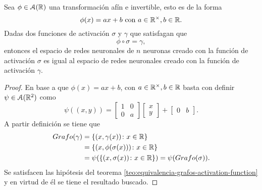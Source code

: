 \begin{corolario}\label{corolario:afine-activation-function}
    Sea $\phi \in \mathcal{A}(\mathbb{R})$ una transformación afín e invertible, esto es de la forma 
    \begin{equation}
        \phi(x) = a x + b 
        \text{ con } a \in \mathbb{R}^\times, b \in \mathbb{R}.
    \end{equation}
    Dadas dos funciones de activación $\sigma$ y $\gamma$ que satisfagan que 
    \begin{equation}
        \phi \circ \sigma = \gamma,
    \end{equation} 
    entonces 
    el espacio de redes neuronales de $n$ neuronas creado con la función de activación $\sigma$ es  
    igual al espacio de redes neuronales creado con la función de activación $\gamma$. 
\end{corolario}
\begin{proof}
    En base a que $\phi(x) = a x + b$, con 
    $a \in \mathbb{R}^\times, b \in \mathbb{R}$
    basta con definir 
     $\psi  \in \mathcal{A}(\mathbb{R}^2)$ como 
    \begin{equation}
        \psi((x,y)) =  
        \begin{bmatrix}
            1 & 0 \\
             0& a
        \end{bmatrix}
        \begin{bmatrix}
            x \\
            y
        \end{bmatrix}
        +
        \begin{bmatrix}
            0 & b
        \end{bmatrix}.
    \end{equation}
    A partir  definición se tiene que 
    \begin{align}
        Grafo(\gamma) &=
        \{ (x, \gamma(x)) \colon x \in \mathbb{R}\} 
        \\
        & = 
        \{ (x, \phi(\sigma(x))) \colon x \in \mathbb{R}\}
        \\
        & =
        \psi(\{ (x, \sigma(x)) \colon x \in \mathbb{R}\})
        = 
        \psi(Grafo(\sigma)).
    \end{align}
    Se satisfacen 
    las hipótesis del teorema \ref{teo:equivalencia-grafos-activation-function} y en virtud de él se tiene el resultado buscado.
\end{proof}


